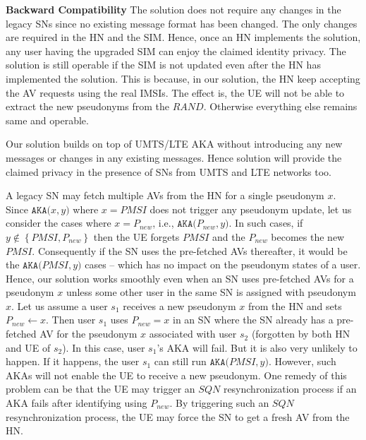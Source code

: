 \documentclass{llncs} %
\begin{document}
\textbf{Backward Compatibility} The solution does not require any changes in the legacy SNs since no existing message format has been changed. The only changes are required in the HN and the SIM. Hence, once an HN implements the solution, any user having the upgraded SIM can enjoy the claimed identity privacy. The solution is still operable if the SIM is not updated even after the HN has implemented the solution. This is because, in our solution, the HN keep accepting the AV requests using the real IMSIs. The effect is, the UE will not be able to extract the new pseudonyms from the $RAND$. Otherwise everything else remains same and operable. 

Our solution builds on top of UMTS/LTE AKA without introducing any new messages or changes in any existing messages. Hence solution will provide the claimed privacy in the presence of SNs from UMTS and LTE networks too. 


A legacy SN may fetch multiple AVs from the HN for a single pseudonym $x$. Since $\texttt{AKA($x,y$)}$ where $x= PMSI$ does not trigger any pseudonym update, let us consider the cases where $x=P_{new}$, i.e.,
$\texttt{AKA($P_{new},y$)}$. In such cases, if $y \notin  \left\lbrace PMSI,P_{new} \right\rbrace$ then the UE forgets $PMSI$ and the $P_{new}$ becomes the new $PMSI$. Consequently if the SN uses the pre-fetched AVs thereafter, it would be the $\texttt{AKA($PMSI,y$)}$ cases -- which has no impact on the pseudonym states of a user. Hence, our solution works smoothly even when an SN uses pre-fetched AVs for a pseudonym $x$ unless some other user in the same SN is assigned with pseudonym $x$. Let us assume a user $s_1$ receives a new pseudonym $x$ from the HN and sets $P_{new} \leftarrow x$. Then user $s_1$ uses $P_{new}=x$ in an SN where the SN already has a pre-fetched AV for the pseudonym $x$ associated with user $s_2$ (forgotten by both HN and UE of $s_2$). In this case, user $s_1$'s AKA will fail. But it is also very unlikely to happen. If it happens, the user $s_1$ can still run $\texttt{AKA($PMSI,y$)}$. However, such AKAs will not enable the UE to receive a new pseudonym. One remedy of this problem can be that the UE may trigger an $SQN$ resynchronization process if an AKA fails after identifying using $P_{new}$. By triggering such an $SQN$ resynchronization process, the UE may force the SN to get a fresh AV from the HN.
\end{document}
